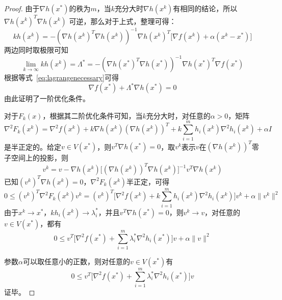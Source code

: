\begin{proof}
由于$\nabla h(x^*)$的秩为$m$，当$k$充分大时$\nabla h(x^k)$有相同的结论，所以$\nabla h(x^k)^T \nabla h(x^k)$ 可逆，那么对于上式，整理可得：
\begin{equation}
    kh(x^k) = -(\nabla h(x^k)^T \nabla h(x^k))^{-1} \nabla h(x^k)^T \big[\nabla f(x^k) + \alpha (x^k - x^*)\big]
\end{equation}
两边同时取极限可知
\begin{equation}
    \lim\limits_{k\rightarrow \infty} kh(x^k) = \Lambda^* = -(\nabla h(x^*)^T \nabla h(x^*))^{-1} \nabla h(x^*)^T \nabla f(x^*)
\end{equation}
根据等式~\eqref{eq:lagrangenecessary}可得
\begin{equation}
    \nabla f(x^*) + \Lambda^* \nabla h(x^*) = 0
\end{equation}
由此证明了一阶优化条件。

对于$F_k(x)$，根据其二阶优化条件可知，当$k$充分大时，对任意的$\alpha>0$，矩阵
\begin{equation}
    \nabla^2 F_k(x^k) = \nabla^2 f(x^k) + k \nabla h(x^k) (\nabla h(x^k))^T + k \sum\limits_{i=1}^m h_i(x^k) \nabla^2 h_i(x^k) + \alpha I
\end{equation}
是半正定的。给定$v\in V(x^*)$，则$v^T \nabla h(x^*) = 0$，取$v^k$表示$v$在$(\nabla h(x^k))^T$零子空间上的投影，则
\begin{equation}
    v^k = v - \nabla h(x^k)\big[(\nabla h(x^k))^T \nabla h(x^k)\big]^{-1} v^T \nabla h(x^k)
\end{equation}
已知$(v^k)^T \nabla h(x^k)=0$，$\nabla^2 F_k(x^k)$半正定，可得
\begin{equation}
    0\le (v^k)^T \nabla^2 F_k(x^k) v^k = (v^k)^T \big[\nabla^2 f(x^k) + k \sum\limits_{i=1}^m h_i(x^k) \nabla^2 h_i(x^k) \big] v^k + \alpha \|v^k\|^2
\end{equation}
由于$x^k\rightarrow x^*$，$kh_i(x^k)\rightarrow \lambda_i^*$，并且$v^T \nabla h(x^*)=0$，则$v^k\rightarrow v$，对任意的$v\in V(x^*)$，都有
\begin{equation}
    0\le v^T \big[\nabla^2 f(x^*) + \sum\limits_{i=1}^m \lambda_i^* \nabla^2 h_i(x^*) \big] v + \alpha \|v\|^2
\end{equation}

参数$\alpha$可以取任意小的正数，则对任意的$v\in V(x^*)$有
\begin{equation}
    0\le v^T \big[\nabla^2 f(x^*) + \sum\limits_{i=1}^m \lambda_i^* \nabla^2 h_i(x^*) \big] v
\end{equation}
证毕。
\end{proof}


